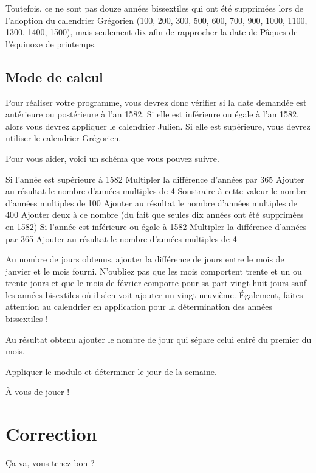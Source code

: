 Toutefois, ce ne sont pas douze années bissextiles qui ont été
supprimées lors de l'adoption du calendrier Grégorien (100, 200, 300,
500, 600, 700, 900, 1000, 1100, 1300, 1400, 1500), mais seulement dix
afin de rapprocher la date de Pâques de l'équinoxe de printemps.

\subsection{Mode de calcul}
\label{mode-de-calcul}

Pour réaliser votre programme, vous devrez donc vérifier si la date
demandée est antérieure ou postérieure à l'an 1582. Si elle est
inférieure ou égale à l'an 1582, alors vous devrez appliquer le
calendrier Julien. Si elle est supérieure, vous devrez utiliser le
calendrier Grégorien.

Pour vous aider, voici un schéma que vous pouvez suivre.

\begin{C}
Si l'année est supérieure à 1582
    Multipler la différence d'années par 365
    Ajouter au résultat le nombre d'années multiples de 4
    Soustraire à cette valeur le nombre d'années multiples de 100
    Ajouter au résultat le nombre d'années multiples de 400
    Ajouter deux à ce nombre (du fait que seules dix années ont été supprimées en 1582)
Si l'année est inférieure ou égale à 1582
    Multipler la différence d'années par 365
    Ajouter au résultat le nombre d'années multiples de 4

Au nombre de jours obtenus, ajouter la différence de jours entre
le mois de janvier et le mois fourni. N'oubliez pas que les mois comportent
trente et un ou trente jours et que le mois de février comporte pour sa
part vingt-huit jours sauf les années bisextiles où il s'en voit ajouter un
vingt-neuvième. Également, faites attention au calendrier en application pour
la détermination des années bissextiles !

Au résultat obtenu ajouter le nombre de jour qui sépare celui entré du premier
du mois.

Appliquer le modulo et déterminer le jour de la semaine.
\end{C}

À vous de jouer !

\section{Correction}
\label{correction-3}

Ça va, vous tenez bon ?

